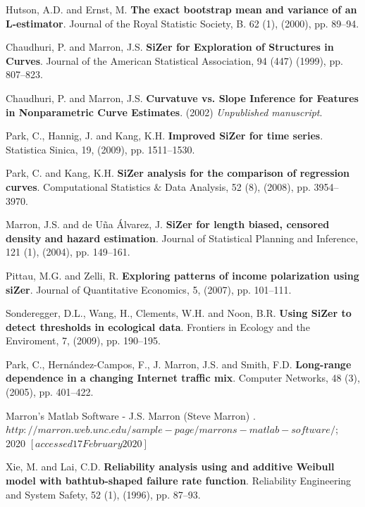 \documentclass[preprint,12pt]{elsarticle}
\begin{document}
\begin{thebibliography}{}
 Hutson, A.D. and Ernst, M. \textbf{The exact bootstrap mean and variance of an L-estimator}. Journal of the Royal Statistic Society, B. 62 (1), (2000), pp. 89--94.


 Chaudhuri, P. and Marron, J.S. \textbf{SiZer for Exploration of Structures in Curves}. Journal of the American Statistical Association, 94 (447) (1999), pp. 807--823.

 Chaudhuri, P. and Marron, J.S. \textbf{Curvatuve vs. Slope Inference for Features in Nonparametric Curve Estimates}. (2002) {\it Unpublished manuscript}.

 Park, C., Hannig, J. and Kang, K.H. \textbf{Improved SiZer for time series}. Statistica Sinica, 19, (2009), pp. 1511--1530.

 Park, C. and Kang, K.H. \textbf{SiZer analysis for the comparison of regression curves}. Computational Statistics $\&$ Data Analysis, 52 (8), (2008), pp. 3954--3970. 


 Marron, J.S. and de U\~na \'Alvarez, J. \textbf{SiZer for length biased, censored density and hazard estimation}. Journal of Statistical Planning and Inference, 121 (1), (2004), pp. 149--161. 

 Pittau, M.G. and Zelli, R. \textbf{Exploring patterns of income polarization using siZer}. Journal of Quantitative Economics, 5, (2007), pp. 101--111.


 Sonderegger, D.L., Wang, H., Clements, W.H. and Noon, B.R. \textbf{Using SiZer to detect thresholds in ecological data}. Frontiers in Ecology and the Enviroment, 7, (2009), pp. 190--195.


 Park, C., Hern\'andez-Campos, F., J. Marron, J.S. and Smith, F.D. \textbf{Long-range dependence in a changing Internet traffic mix}. Computer Networks, 48 (3), (2005), pp. 401--422.



 Marron's Matlab Software - J.S. Marron (Steve Marron) . $http://marron.web.unc.edu/sample-page/marrons-matlab-software/$; 2020 $[accessed 17 February 2020]$


 
 Xie, M. and Lai, C.D.  \textbf{Reliability analysis using and additive Weibull model with bathtub-shaped failure rate function}. Reliability Engineering and System Safety, 52 (1), (1996), pp. 87--93.




\end{thebibliography}
\end{document}
